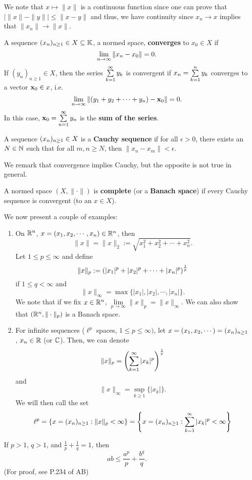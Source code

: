 We note that $x \mapsto \| x \|$ is a continuous function since one can prove that $\left| \| x \| - \| y \| \right| \leq \| x - y \|$ and thus, we have continuity since $x_n \to x$ implies that $\| x_n \| \to \| x \|$. 
\begin{definition}
A sequence $(x_n)_{n \geq 1} \in X \subseteq \mathbb{K}$, a normed space, \textbf{converges} to $x_0 \in X$ if 
\[ \lim\limits_{n \to \infty} \| x_n - x_0 \| = 0.\]
If $(y_n)_{n \geq 1}  \in X$, then the series $\sum\limits_{k = 1}^{\infty} y_k$ is convergent if $x_n = \sum\limits_{k = 1}^n y_k$ converges to a vector $\mathbf{x}_0 \in x$, i.e.
\[ \lim\limits_{n \to \infty} \| (y_1 + y_2 + \cdots + y_n) - \mathbf{x}_0 \| = 0.\]
In this case, $\mathbf{x}_0 = \sum\limits_{n = 1}^{\infty} y_n$ is the \textbf{sum of the series}.
\end{definition}
\begin{definition}
A sequence $(x_n)_{n \geq 1} \in X$ is a \textbf{Cauchy sequence} if for all $\epsilon > 0$, there exists an $N \in {\mathbb N}$ such that for all $m, n \geq N$, then $\| x_n - x_m \| < \epsilon$. 
\end{definition}
We remark that convergence implies Cauchy, but the opposite is not true in general.
\begin{definition}
A normed space $(X, \| \cdot \|)$ is \textbf{complete} (or a \textbf{Banach space}) if every Cauchy sequence is convergent (to an $x \in X$). 
\end{definition}
We now present a couple of examples:
\begin{enumerate}
\item On ${\mathbb R}^n$, $x = (x_1, x_2, \cdots, x_n) \in {\mathbb R}^n$, then 
\[ \| x \| = \| x \|_2 := \sqrt{x_1^2 + x_2^2 + \cdots + x_n^2}.\]
Let $1 \leq p \leq \infty$ and define 
\[ \| x \|_p := \left(|x_1|^p + |x_2|^p + \cdots + |x_n|^p  \right)^{\frac{1}{p}} \]
if $1 \leq q < \infty$ and 
\[ \| x \|_{\infty} = \max \{ |x_1| , |x_2|, \cdots, |x_n| \}.\]
We note that if we fix $x \in {\mathbb R}^n$, $\lim\limits_{p \to \infty} \| x \|_p = \| x \|_{\infty}$. We can also show that $\left( {\mathbb R}^n, \| \cdot \|_p \right)$ is a Banach space. 
\item For infinite sequences ($\ell^p$ spaces, $1 \leq p \leq \infty)$, let $x = (x_1, x_2, \cdots) = (x_n)_{n \geq 1}$, $x_n \in {\mathbb R}$ (or ${\mathbb C}$). Then, we can denote 
\[ \| x \|_p = \left( \sum\limits_{k = 1}^{\infty} |x_k|^p \right)^{\frac{1}{p}} \]
and 
\[ \|x \|_{\infty} = \sup\limits_{k \geq 1} \{ |x_k| \}.\]
We will then call the set 
\[ \ell^p = \{ x = (x_n)_{n \geq 1} : \| x \|_p < \infty \} = \left\lbrace x = (x_n)_{n \geq 1} : \sum\limits_{k = 1}^{\infty} |x_k|^p < \infty \right\rbrace \]
\end{enumerate}
\begin{lemma}
If $p > 1$, $q > 1$, and $\frac{1}{p} + \frac{1}{q} = 1$, then 
\[ ab \leq \frac{a^p}{p} + \frac{b^q}{q}.\] (For proof, see P.234 of AB)
\end{lemma}
